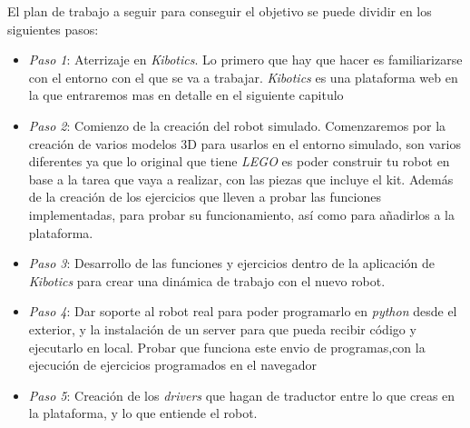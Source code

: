 El plan de trabajo a seguir para conseguir el objetivo se puede dividir en los siguientes pasos:
\begin{itemize}
    \item \textit{Paso 1}: Aterrizaje en \textit{Kibotics}. Lo primero que hay que hacer es familiarizarse con el entorno con el que se va a trabajar. \textit{Kibotics} es una plataforma web en la que entraremos mas en detalle en el siguiente capitulo 
    \item \textit{Paso 2}: Comienzo de la creación del robot simulado. Comenzaremos por la creación de varios modelos 3D para usarlos en el entorno simulado, son varios diferentes ya que lo original que tiene \textit{LEGO} es poder construir tu robot en base a la tarea que vaya a realizar, con las piezas que incluye el kit. Además de la creación de los ejercicios que lleven a probar las funciones implementadas, para probar su funcionamiento, así como para añadirlos a la plataforma.
    \item \textit{Paso 3}: Desarrollo de las funciones y ejercicios dentro de la aplicación de \textit{Kibotics} para crear una dinámica de trabajo con el nuevo robot.
    \item \textit{Paso 4}: Dar soporte al robot real para poder programarlo en \textit{python} desde el exterior, y la instalación de un server para que pueda recibir código y ejecutarlo en local.\newline
Probar que funciona este envio de programas,con la ejecución de ejercicios programados en el navegador
    \item \textit{Paso 5}: Creación de los \textit{drivers} que hagan de traductor entre lo que creas en la plataforma, y lo que entiende el robot. 
\end{itemize}